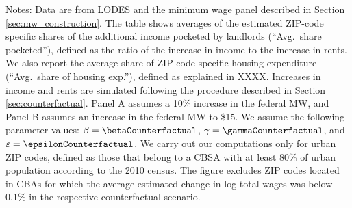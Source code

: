 \begin{table}[hbt!]
    \begin{minipage}{.95\textwidth} \footnotesize
        \vspace{2mm}
        Notes: 
        Data are from LODES and the minimum wage panel described in Section 
        \ref{sec:mw_construction}.
        The table shows averages of the estimated ZIP-code specific shares of the 
        additional income pocketed by landlords (``Avg.\ share pocketed''), 
        defined as the ratio of the increase in income to the increase in rents.
        We also report the average share of ZIP-code specific housing expenditure
        (``Avg.\ share of housing exp.''), defined as explained in XXXX.
        Increases in income and rents are simulated following the procedure 
        described in Section \ref{sec:counterfactual}.
        Panel A assumes a 10\% increase in the federal MW, and
        Panel B assumes an increase in the federal MW to \$15.
        We assume the following parameter values:
        $\beta = \betaCounterfactual$, $\gamma = \gammaCounterfactual$, and $\varepsilon = \epsilonCounterfactual$.
        We carry out our computations only for urban ZIP codes, defined as 
        those that belong to a CBSA with at least 80\% of urban population
        according to the 2010 census.
        The figure excludes ZIP codes located in CBAs for which the average
        estimated change in log total wages was below 0.1\% in the respective
        counterfactual scenario.
    \end{minipage}
\end{table}
